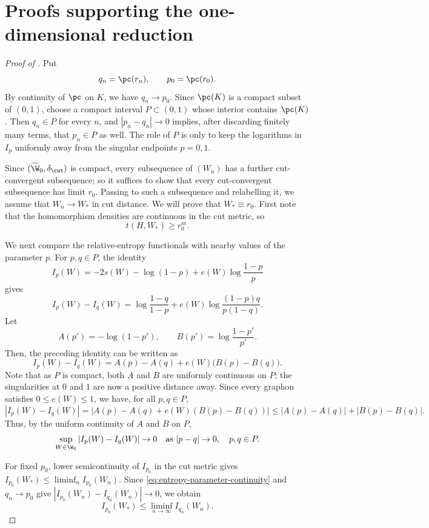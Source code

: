 \section{Proofs supporting the one-dimensional reduction}
\label{app:local-reduction}

\begin{proof}[Proof of ]
Put
\[
  q_n=\pc(r_n),
  \qquad
  p_0=\pc(r_0).
\]
By continuity of $\pc$ on $K$, we have $q_n\to p_0$.  Since $\pc(K)$ is a compact subset of $(0,1)$, choose a
compact interval $P\subset(0,1)$ whose interior contains $\pc(K)$.  Then
$q_n\in P$ for every $n$, and $|p_n-q_n|\to0$ implies, after discarding
finitely many terms, that $p_n\in P$ as well.
The role of $P$ is only to keep the logarithms in $I_p$ uniformly away from the
singular endpoints $p=0,1$.

Since $(\widetilde{\W}_0,\delta_\cut)$ is compact, every subsequence of
$(W_n)$ has a further cut-convergent subsequence; so it suffices to show that
every cut-convergent subsequence has limit $r_0$.
Passing to such a subsequence and relabelling it, we assume that $W_n\to W_*$ in cut distance.
We will prove that $W_*\equiv r_0$.
First note that the homomorphism densities
are continuous in the cut metric, so
\begin{equation}
  \label{eq:boundary-limit-feasibility}
  t(H,W_*)\ge r_0^m.
\end{equation}

We next compare the relative-entropy functionals with nearby values of the
parameter $p$.  For $p,q\in P$, the identity
\[
  I_p(W)
  =
  -2s(W)-\log(1-p)+e(W)\log\frac{1-p}{p}
\]
gives
\[
  I_p(W)-I_q(W)
  =
  \log\frac{1-q}{1-p}
  +e(W)\log\frac{(1-p)q}{p(1-q)}.
\]
Let
\[
  A(p')=-\log(1-p'),
  \qquad
  B(p')=\log\frac{1-p'}{p'}.
\]
Then, the preceding identity can be written as
\[
  I_p(W)-I_q(W)=A(p)-A(q)+e(W)\bigl(B(p)-B(q)\bigr).
\]
Note that as $P$ is compact, both $A$ and $B$
are uniformly continuous on $P$; the singularities at $0$ and $1$ are now a
positive distance away.
Since every graphon satisfies
$0\le e(W)\le1$, we have, for all $p,q\in P$,
\[
  |I_p(W)-I_q(W)| = |A(p)-A(q)+e(W)(B(p)-B(q))|
  \le |A(p)-A(q)| + |B(p)-B(q)|.
\]
Thus, by the uniform continuity of $A$ and $B$ on $P$,
\begin{equation}\label{eq:entropy-parameter-continuity}
\sup_{W\in\W_0}|I_p(W)-I_q(W)|\to0
\quad\text{as } |p-q|\to0,\quad p,q\in P.
\end{equation}


For fixed $p_0$, lower semicontinuity of $I_{p_0}$ in the cut metric gives
$I_{p_0}(W_*)\le\liminf_n I_{p_0}(W_n)$.  Since
\eqref{eq:entropy-parameter-continuity} and $q_n\to p_0$ give
$|I_{p_0}(W_n)-I_{q_n}(W_n)|\to0$, we obtain
\begin{equation}\label{eq:entropy-moving-parameter-lsc}
  I_{p_0}(W_*)
  \le
  \liminf_{n\to\infty} I_{q_n}(W_n).
\end{equation}


\end{proof}
